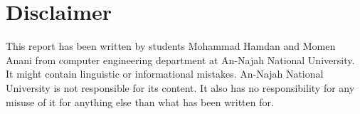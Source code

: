 \documentclass[a4paper,11pt,oneside]{book}
\begin{document}

   
       

         
    
    
    
    \chapter*{Disclaimer}
    This report has been written by students Mohammad Hamdan and Momen Anani from computer engineering department at An-Najah National University. It might contain linguistic or informational mistakes. An-Najah National University is not responsible for its content. It also has no responsibility for any misuse of it for anything else than what has been written for.

    \tableofcontents
    \listoffigures
    \listoftables



    
    
    \mainmatter
    
    
    
    
    
    
    
\end{document}
